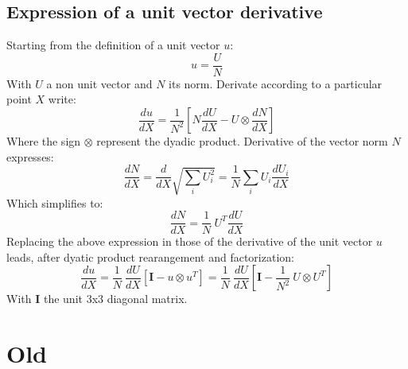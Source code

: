 \documentclass[11pt]{article}
\begin{document}
\subsection{Expression of a unit vector derivative}
Starting from the definition of a unit vector $u$:
\begin{equation}
u = \frac{U}{N}
\end{equation}
With $U$ a non unit vector and $N$ its norm.
Derivate according to a particular point $X$ write:
\begin{equation}
\frac{du}{dX} = \frac{1}{N^2} \left[ N \frac{dU}{dX} - U \otimes \frac{dN}{dX} \right]
\end{equation}
Where the sign $\otimes$ represent the dyadic product. Derivative of the vector norm $N$ expresses:
\begin{equation}
\frac{dN}{dX} = \frac{d}{dX} \sqrt{\sum_i U_i^2} =
\frac{1}{N} \sum_i U_i \frac{dU_i}{dX}
\end{equation}
Which simplifies to:
\begin{equation}
\frac{dN}{dX} = \frac{1}{N}\ U^T \frac{dU}{dX}
\end{equation}
Replacing the above expression in those of the derivative of the unit vector $u$ leads, after dyatic product rearangement and factorization:
\begin{equation}
\frac{du}{dX} = \frac{1}{N}\ \frac{dU}{dX} \left[ \boldsymbol{I} - u \otimes u^T \right] = \frac{1}{N}\ \frac{dU}{dX} \left[ \boldsymbol{I} - \frac{1}{N^2}\ U \otimes U^T \right]
\end{equation}
With $\boldsymbol{I}$ the unit 3x3 diagonal matrix.





\section{Old}
\end{document}
